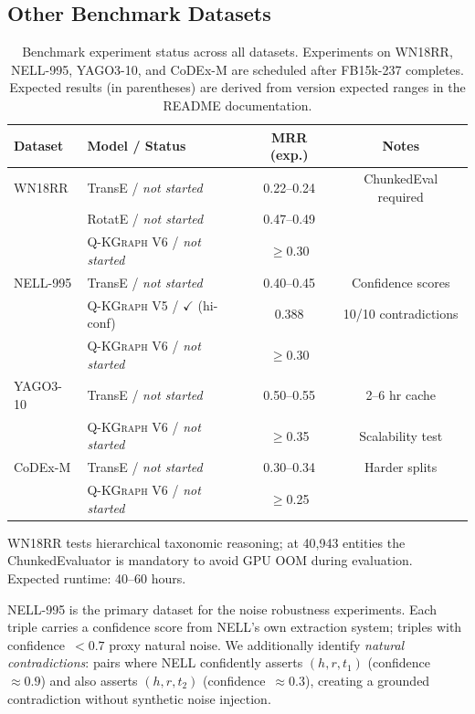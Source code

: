 \documentclass[runningheads]{llncs}
\newcommand{\QR}{\textsc{Q-KGraph}}
\newcommand{\inprog}[1]{\textcolor{inprogress}{\textit{#1}}}
\begin{document}
\subsection{Other Benchmark Datasets}

\begin{table}[t]
\caption{Benchmark experiment status across all datasets.  Experiments on
  WN18RR, NELL-995, YAGO3-10, and CoDEx-M are scheduled after FB15k-237
  completes.  Expected results (in parentheses) are derived from version
  expected ranges in the README documentation.}
\label{tab:multi}
\centering
\small
\begin{tabular}{llcc}
\toprule
Dataset      & Model / Status                        & MRR (exp.) & Notes \\
\midrule
WN18RR       & TransE / \inprog{not started}         & 0.22--0.24 & ChunkedEval required \\
             & RotatE / \inprog{not started}         & 0.47--0.49 & \\
             & \QR{} V6 / \inprog{not started}      & $\geq$0.30 & \\
\midrule
NELL-995     & TransE / \inprog{not started}         & 0.40--0.45 & Confidence scores \\
             & \QR{} V5 / $\checkmark$ (hi-conf)   & 0.388 & 10/10 contradictions \\
             & \QR{} V6 / \inprog{not started}      & $\geq$0.30 & \\
\midrule
YAGO3-10     & TransE / \inprog{not started}         & 0.50--0.55 & 2--6 hr cache \\
             & \QR{} V6 / \inprog{not started}      & $\geq$0.35 & Scalability test \\
\midrule
CoDEx-M      & TransE / \inprog{not started}         & 0.30--0.34 & Harder splits \\
             & \QR{} V6 / \inprog{not started}      & $\geq$0.25 & \\
\bottomrule
\end{tabular}
\end{table}

WN18RR tests hierarchical taxonomic reasoning; at 40,943 entities the
ChunkedEvaluator is mandatory to avoid GPU OOM during evaluation.  Expected
runtime: 40--60 hours.

NELL-995 is the primary dataset for the noise robustness experiments.  Each
triple carries a confidence score from NELL's own extraction system; triples
with confidence~$<0.7$ proxy natural noise.  We additionally identify
\emph{natural contradictions}: pairs where NELL confidently asserts
$(h,r,t_1)$ (confidence~$\approx0.9$) and also asserts $(h,r,t_2)$
(confidence~$\approx0.3$), creating a grounded contradiction without synthetic
noise injection.
\end{document}
